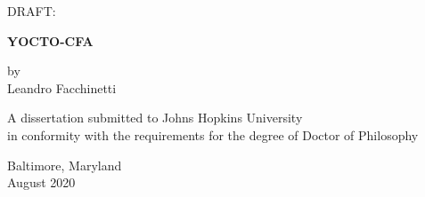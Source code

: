 \documentclass[12pt, oneside]{book}
\begin{document}
\frontmatter

\begin{center}
\begin{singlespace}
\vspace*{0.5in}

DRAFT: \DTMnow %

\textbf{\uppercase{Yocto-CFA}}

\vspace*{1in}

by\\Leandro Facchinetti

\vspace*{1.5in}

A dissertation submitted to Johns Hopkins University\\in conformity with the requirements for the degree of Doctor of Philosophy

\vspace*{0.5in}

Baltimore, Maryland\\August 2020
\end{singlespace}
\end{center}

\thispagestyle{empty}
\clearpage








\end{document}
